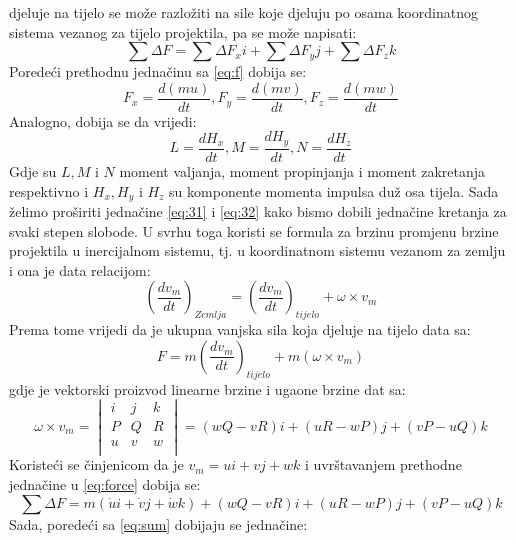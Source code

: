 djeluje na tijelo se može razložiti na sile koje djeluju po osama koordinatnog sistema 
vezanog za tijelo projektila, pa se može napisati:
\begin{equation}
    \sum \Delta F=\sum \Delta  F_xi+\sum \Delta  F_yj+\sum \Delta  F_zk
    \label{eq:sum}
\end{equation}
Poredeći prethodnu jednačinu sa \ref{eq:f} dobija se:
\begin{equation}
    F_x=\frac{d(mu)}{dt}, F_y=\frac{d(mv)}{dt}, F_z=\frac{d(mw)}{dt}
    \label{eq:31}
\end{equation}
Analogno, dobija se da vrijedi:
\begin{equation}
    L=\frac{dH_x}{dt},M=\frac{dH_y}{dt},N=\frac{dH_z}{dt}
    \label{eq:32}
\end{equation}
Gdje su $L,M$ i $N$ moment valjanja, moment propinjanja i moment zakretanja respektivno i 
$H_x, H_y$ i $H_z$ su komponente momenta impulsa duž osa tijela. 
Sada želimo proširiti jednačine \ref{eq:31} i \ref{eq:32} kako bismo dobili 
jednačine kretanja za svaki stepen slobode. U svrhu toga koristi se formula za 
brzinu promjenu brzine projektila u inercijalnom sistemu, tj. u koordinatnom sistemu 
vezanom za zemlju i ona je data relacijom:
\begin{equation}
    \left( \frac{dv_m}{dt}\right)_{Zemlja}=\left(\frac{dv_m}{dt}\right)_{tijelo}+\omega \times v_m
\end{equation}
Prema tome vrijedi da je ukupna vanjska sila koja djeluje na tijelo data sa:
\begin{equation}
    F=m\left(\frac{dv_m}{dt}\right)_{tijelo}+m(\omega \times v_m)
    \label{eq:force}
\end{equation}
gdje je vektorski proizvod linearne brzine i ugaone brzine dat sa:
\begin{equation}
    \omega \times v_m=\begin{vmatrix}
        i&j&k\\
        P&Q&R\\
        u&v&w\\
    \end{vmatrix}=(wQ-vR)i+(uR-wP)j+(vP-uQ)k
\end{equation}
Koristeći se činjenicom da je $v_m=ui+vj+wk$ i uvrštavanjem prethodne jednačine u \ref{eq:force} dobija se:
\begin{equation}
    \sum \Delta F=m(\dot{u}i+\dot{v}j+\dot{w}k)+(wQ-vR)i+(uR-wP)j+(vP-uQ)k
\end{equation}
Sada, poredeći sa \ref{eq:sum} dobijaju se jednačine:
